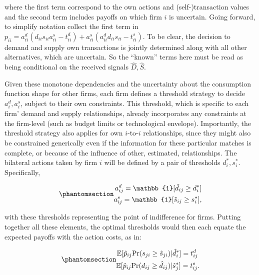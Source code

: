 \documentclass[
]{article}
\theoremstyle{definition}
\theoremstyle{plain}
\theoremstyle{remark}
\begin{document}
where the first term correspond to the own actions and
(self-)transaction values and the second term includes payoffs on which
firm \(i\) is uncertain. Going forward, to simplify notation collect the
first term in
\(p_{ii} = a_{ii}^d (d_{ii} s_{ii} a_{ii}^s - t_{ii}^d) + a_{ii}^s (a_{ii}^d d_{ii} s_{ii} - t_{ii}^s)\).
To be clear, the decision to demand and supply own transactions is
jointly determined along with all other alternatives, which are
uncertain. So the ``known'' terms here must be read as being conditional
on the received signals \(\hat{D}, \hat{S}\).

Given these monotone dependencies and the uncertainty about the
consumption function shape for other firms, each firm defines a
threshold strategy to decide \(a_{i}^d, a_{i}^s\), subject to their own
constraints. This threshold, which is specific to each firm' demand and
supply relationships, already incorporates any constraints at the
firm-level (such as budget limits or technological envelope).
Importantly, the threshold strategy also applies for own \(i\)-to-\(i\)
relationships, since they might also be constrained generically even if
the information for these particular matches is complete, or because of
the influence of other, estimated, relationships. The bilateral actions
taken by firm \(i\) will be defined by a pair of thresholds
\(d_{i}^*, s_{i}^*\). Specifically,

\begin{equation}\phantomsection\label{eq-thresholds}{
\begin{split}
a_{ij}^d = \mathbb{1}[\tilde{d}_{ij} \geq d_{i}^*] \\
a_{ij}^s = \mathbb{1}[\tilde{s}_{ij} \geq s_{i}^*],
\end{split}
}\end{equation}

with these thresholds representing the point of indifference for firms.
Putting together all these elements, the optimal thresholds would then
each equate the expected payoffs with the action costs, as in:

\begin{equation}\phantomsection\label{eq-indif}{
\begin{split}
\mathbb{E}[\hat{p}_{ij} \text{Pr}(s_{ji} \geq \hat{s}_{ji}) &| \hat{d}_{i}^*] = t_{ij}^d \\
\mathbb{E}[\hat{p}_{ij} \text{Pr}(d_{ij} \geq \hat{d}_{ij}) &| \hat{s}_{j}^*] = t_{ij}^s.
\end{split}
}\end{equation}
\end{document}
